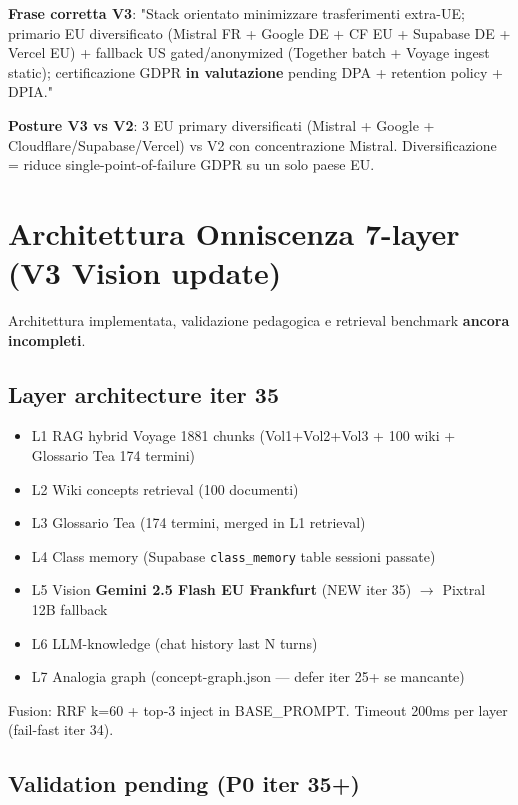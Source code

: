 \documentclass[12pt,a4paper]{article}
\begin{document}
\textbf{Frase corretta V3}: "Stack orientato minimizzare trasferimenti extra-UE; primario EU diversificato (Mistral FR + Google DE + CF EU + Supabase DE + Vercel EU) + fallback US gated/anonymized (Together batch + Voyage ingest static); certificazione GDPR \textbf{in valutazione} pending DPA + retention policy + DPIA."

\textbf{Posture V3 vs V2}: 3 EU primary diversificati (Mistral + Google + Cloudflare/Supabase/Vercel) vs V2 con concentrazione Mistral. Diversificazione = riduce single-point-of-failure GDPR su un solo paese EU.

\section{Architettura Onniscenza 7-layer (V3 Vision update)}

Architettura implementata, validazione pedagogica e retrieval benchmark \textbf{ancora incompleti}.

\subsection*{Layer architecture iter 35}

\begin{itemize}[leftmargin=*]
  \item L1 RAG hybrid Voyage 1881 chunks (Vol1+Vol2+Vol3 + 100 wiki + Glossario Tea 174 termini)
  \item L2 Wiki concepts retrieval (100 documenti)
  \item L3 Glossario Tea (174 termini, merged in L1 retrieval)
  \item L4 Class memory (Supabase \texttt{class\_memory} table sessioni passate)
  \item L5 Vision \textbf{Gemini 2.5 Flash EU Frankfurt} (NEW iter 35) \(\rightarrow\) Pixtral 12B fallback
  \item L6 LLM-knowledge (chat history last N turns)
  \item L7 Analogia graph (concept-graph.json --- defer iter 25+ se mancante)
\end{itemize}

Fusion: RRF k=60 + top-3 inject in BASE\_PROMPT. Timeout 200ms per layer (fail-fast iter 34).

\subsection*{Validation pending (P0 iter 35+)}
\end{document}
